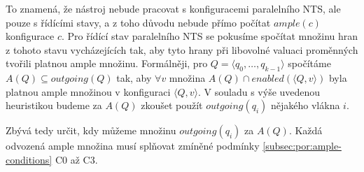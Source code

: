 \documentclass{fithesis2}
\newcommand{\tuple}[1]{\langle #1 \rangle}
\begin{document}
To znamená, že nástroj nebude pracovat s konfiguracemi paralelního NTS, ale pouze s řídícími stavy, a z toho důvodu nebude přímo počítat $\mathit{ample}(c)$ konfigurace $c$. Pro řídící stav paralelního NTS se pokusíme spočítat množinu hran z tohoto stavu vycházejících tak, aby tyto hrany při libovolné valuaci proměnných tvořili platnou ample množinu. Formálněji, pro $Q = \tuple{q_{0}, \ldots, q_{k-1}}$ spočítáme $A(Q) \subseteq \mathit{outgoing}(Q)$ tak, aby $\forall v$ množina $A(Q) \cap \mathit{enabled}\left({\tuple{Q, v}}\right)$ byla platnou ample množinou v konfiguraci $\tuple{Q,v}$. V souladu s výše uvedenou heuristikou budeme za $A(Q)$ zkoušet použít $\mathit{outgoing}(q_i)$ nějakého vlákna $i$.

Zbývá tedy určit, kdy můžeme množinu $\mathit{outgoing}(q_i)$ za $A(Q)$. Každá odvozená ample množina musí splňovat zmíněné podmínky \ref{subsec:por:ample-conditions} C0 až C3.
\end{document}
